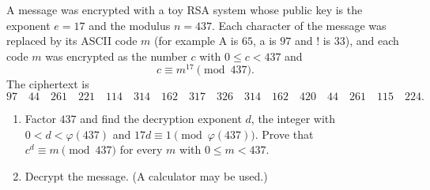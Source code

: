 A message was encrypted with a toy RSA system whose public key is the exponent $e=17$ and the modulus $n=437$. Each character of the message was replaced by its ASCII code $m$ (for example A is $65$, a is $97$ and ! is $33$), and each code $m$ was encrypted as the number $c$ with $0\le c<437$ and
\[c\equiv m^{17}\pmod{437}.\]
The ciphertext is
\[97\quad44\quad261\quad221\quad114\quad314\quad162\quad317\quad326\quad314\quad162\quad420\quad44\quad261\quad115\quad224 .\]
\begin{enumerate}
\item[(a)] Factor $437$ and find the decryption exponent $d$, the integer with $0<d<\varphi(437)$ and $17d\equiv1\pmod{\varphi(437)}$. Prove that $c^d\equiv m\pmod{437}$ for every $m$ with $0\le m<437$.
\item[(b)] Decrypt the message. (A calculator may be used.)
\end{enumerate}
